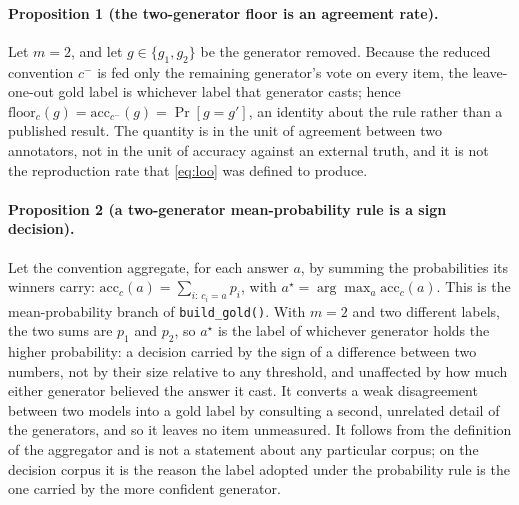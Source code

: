 \documentclass{article}
\newcommand{\ids}[1]{\texttt{\small #1}} %
\begin{document}
\paragraph{Proposition 1 (the two-generator floor is an agreement rate).} Let $m = 2$, and let $g \in \{g_1, g_2\}$ be the generator removed. Because the reduced convention $c^-$ is fed only the remaining generator's vote on every item, the leave-one-out gold label is whichever label that generator casts; hence $\mathrm{floor}_c(g) = \mathrm{acc}_{c^-}(g) = \Pr[g = g']$, an identity about the rule rather than a published result. The quantity is in the unit of agreement between two annotators, not in the unit of accuracy against an external truth, and it is not the reproduction rate that \eqref{eq:loo} was defined to produce.

\paragraph{Proposition 2 (a two-generator mean-probability rule is a sign decision).} Let the convention aggregate, for each answer $a$, by summing the probabilities its winners carry: $\mathrm{acc}_c(a) = \sum_{i:\,c_i = a} p_i$, with $a^{\star} = \arg\max_a \mathrm{acc}_c(a)$. This is the mean-probability branch of \ids{build\_gold()}. With $m=2$ and two different labels, the two sums are $p_1$ and $p_2$, so $a^{\star}$ is the label of whichever generator holds the higher probability: a decision carried by the sign of a difference between two numbers, not by their size relative to any threshold, and unaffected by how much either generator believed the answer it cast. It converts a weak disagreement between two models into a gold label by consulting a second, unrelated detail of the generators, and so it leaves no item unmeasured. It follows from the definition of the aggregator and is not a statement about any particular corpus; on the decision corpus it is the reason the label adopted under the probability rule is the one carried by the more confident generator.
\end{document}
